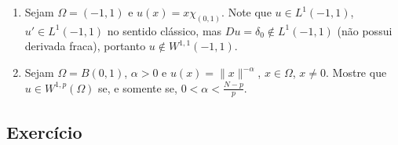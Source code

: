 \begin{frame}
	\begin{exe}
\begin{enumerate}[a]
	\item Sejam $\Omega=(-1,1)$ e	$u(x)=x\chi_{(0,1)}$. Note que $u\in L^1(-1,1)$, $u'\in L^1(-1,1)$ no sentido clássico, mas $Du=\delta_0\not\in L^1(-1,1)$ (não possui derivada fraca), portanto $u\not\in W^{1,1}(-1,1)$.
	
	\item Sejam $\Omega=B(0,1)$, $\alpha>0$ e $u(x)=\|x\|^{-\alpha}$, $x\in \Omega$, $x\neq 0$. Mostre que $u\in W^{1,p}(\Omega)$ se, e somente se, $0<\alpha<\frac{N-p}{p}$.
\end{enumerate}

	\end{exe}

\subsection*{Exercício \theexer}
\end{frame}

%



